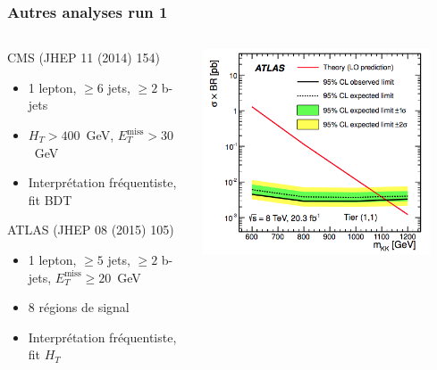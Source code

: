\begin{frame}
\frametitle{Autres analyses run 1}
\begin{columns}
\begin{column}{0.64\textwidth}
\begin{small}
\begin{maliste}
\item CMS (JHEP 11 (2014) 154) 
\begin{itemize}
\item 1 lepton, $\geq 6$ jets, $\geq 2$ b-jets
\item $H_T>400$~GeV, $E_T^\text{miss} > 30$~GeV
\item Interpr\'etation fr\'equentiste, fit BDT 
\end{itemize}
\vspace*{0.3cm}
\item ATLAS (JHEP 08 (2015) 105)
\begin{itemize}
\item 1 lepton, $\geq 5$ jets, $\geq 2$ b-jets, $E_T^\text{miss} \geq 20$~GeV
\item 8 r\'egions de signal
\item Interpr\'etation fr\'equentiste, fit $H_T$ 
\end{itemize}
\end{maliste}
\end{small}
\end{column}
\begin{column}{0.4\textwidth}
\begin{center}
\vspace*{-1.5cm}
\hspace*{-.4cm}
\includegraphics[width=0.89\textwidth]{Figures/FourTops/ATLASSingleLeptonResultTier11sym.png}

\end{center}
\end{column}
\end{columns}
\end{frame}
